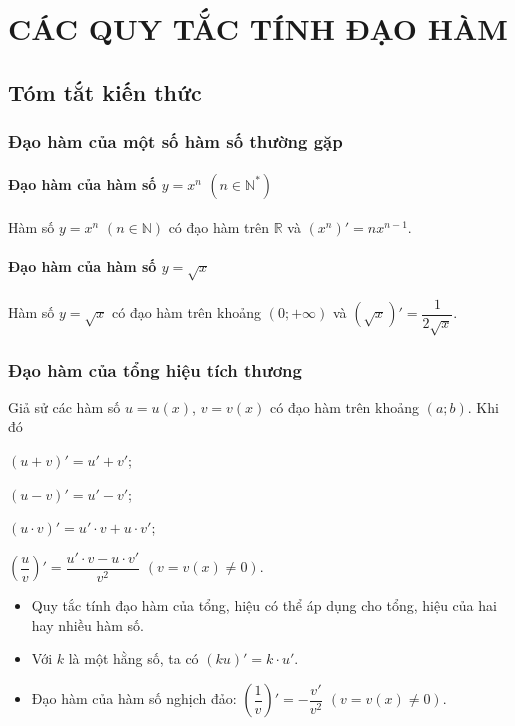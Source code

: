 \section{CÁC QUY TẮC TÍNH ĐẠO HÀM}
\subsection{Tóm tắt kiến thức}
\subsubsection{Đạo hàm của một số hàm số thường gặp}
\paragraph{Đạo hàm của hàm số \boldmath $y=x^n$ $\left(n\in \mathbb{N}^*\right)$}
\begin{dl}
	Hàm số $y=x^n$ $\left(n\in \mathbb{N}\right)$ có đạo hàm trên $\mathbb{R}$ và $\left(x^n\right)'=nx^{n-1}$.
\end{dl}
\paragraph{Đạo hàm của hàm số \boldmath $y=\sqrt{x}$}
\begin{dl}
	Hàm số $y=\sqrt{x}$ có đạo hàm trên khoảng $\left(0;+\infty\right)$ và $\left(\sqrt{x}\right)'=\dfrac{1}{2\sqrt{x}}$.
\end{dl}
\subsubsection{Đạo hàm của tổng hiệu tích thương}
\begin{dl}
Giả sử các hàm số $u=u(x)$, $v=v(x)$ có đạo hàm trên khoảng $\left(a;b\right)$. Khi đó
\begin{enumEX}[\itemCI]{2}
	\item $\left(u+v\right)'=u'+v'$;	
	\item $\left(u-v\right)'=u'-v'$;
	\item $\left(u\cdot v\right)'=u'\cdot v+u\cdot v'$;	
	\item $\left(\dfrac{u}{v}\right)'=\dfrac{u'\cdot v-u\cdot v'}{v^2}$ $\left(v=v(x)\neq 0\right)$. 
\end{enumEX}
\end{dl}
\begin{note}
	\begin{itemize}
	\item Quy tắc tính đạo hàm của tổng, hiệu có thể áp dụng cho tổng, hiệu của hai hay nhiều hàm số.
	\item Với $k$ là một hằng số, ta có $\left(ku\right)'=k\cdot u'$.
	\item Đạo hàm của hàm số nghịch đảo: $\left(\dfrac{1}{v}\right)'=-\dfrac{v'}{v^2}$ $\left(v=v(x)\neq 0\right)$.
	\end{itemize}
\end{note}
